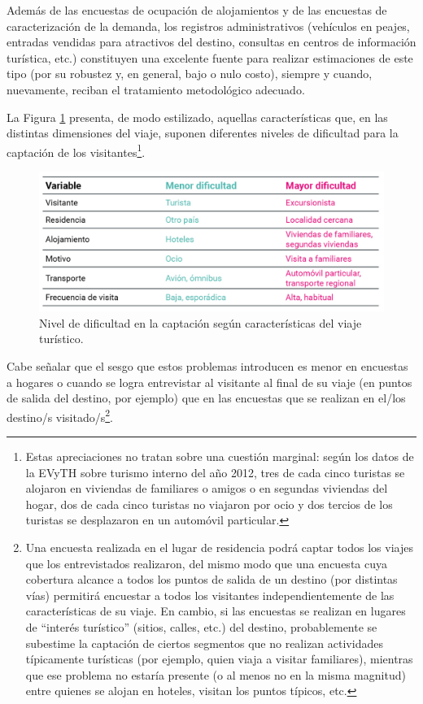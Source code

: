 \documentclass[
  openany]{book}
\begin{document}
Además de las encuestas de ocupación de alojamientos y de las encuestas de caracterización de la demanda, los registros administrativos (vehículos en peajes, entradas vendidas para atractivos del destino, consultas en centros de información turística, etc.) constituyen una excelente fuente para realizar estimaciones de este tipo (por su robustez y, en general, bajo o nulo costo), siempre y cuando, nuevamente, reciban el tratamiento metodológico adecuado.

La Figura \ref{fig:dificultad} presenta, de modo estilizado, aquellas características que, en las distintas dimensiones del viaje, suponen diferentes niveles de dificultad para la captación de los visitantes\footnote{Estas apreciaciones no tratan sobre una cuestión marginal: según los datos de la EVyTH sobre turismo interno del año 2012, tres de cada cinco turistas se alojaron en viviendas de familiares o amigos o en segundas viviendas del hogar, dos de cada cinco turistas no viajaron por ocio y dos tercios de los turistas se desplazaron en un automóvil particular.}.

\begin{figure}

{\centering \includegraphics[width=0.8\linewidth]{imagenes/figura1.4} 

}

\caption{Nivel de dificultad en la captación según características del viaje turístico.}\label{fig:dificultad}
\end{figure}

Cabe señalar que el sesgo que estos problemas introducen es menor en encuestas a hogares o cuando se logra entrevistar al visitante al final de su viaje (en puntos de salida del destino, por ejemplo) que en las encuestas que se realizan en el/los destino/s visitado/s\footnote{Una encuesta realizada en el lugar de residencia podrá captar todos los viajes que los entrevistados realizaron, del mismo modo que una encuesta cuya cobertura alcance a todos los puntos de salida de un destino (por distintas vías) permitirá encuestar a todos los visitantes independientemente de las características de su viaje. En cambio, si las encuestas se realizan en lugares de ``interés turístico'' (sitios, calles, etc.) del destino, probablemente se subestime la captación de ciertos segmentos que no realizan actividades típicamente turísticas (por ejemplo, quien viaja a visitar familiares), mientras que ese problema no estaría presente (o al menos no en la misma magnitud) entre quienes se alojan en hoteles, visitan los puntos típicos, etc.}.
\end{document}
